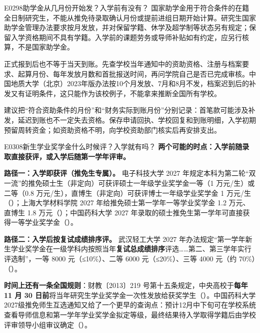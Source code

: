 \begin{qa}{E0298}{助学金从几月份开始发？入学前有没有？}
国家助学金用于符合条件的在籍全日制研究生，不能从推免待录取确认月份或提前进组日期开始计算。研究生国家助学金管理办法要求按月发放，并对保留学籍、休学及超学制等状态另有规定；保留入学资格期间不具有学籍。入学前的课题劳务或导师补贴如有约定，应另行核算，不是国家助学金。 

正式报到后也不等于当天到账。先查学校当年通知中的资助资格、注册与档案要求、起算月份、每年发放月数和首批报送时间，再问学院自己是否已完成审核。中国地质大学（北京）2023年版办法按10个月发放、7月和8月不发，档案迟到后的补发又有证明条件，这只能作为该校例子，不能拿来推断全国所有学校。

建议把“符合资助条件的月份”和“财务实际到账月份”分别记录：首笔款可能涉及补发，延迟到账也不一定失去资格。保存申请回执、学校回复和到账明细，入学初期预留周转资金；如资助资格不明，向学校资助部门核实后再安排支出。
\end{qa}

\begin{qa}{E0308}{新生学业奖学金什么时候评？入学就有吗？}
\textbf{两个可能的时点：入学前随录取直接获评，或入学后随第一学年评审。}

\textbf{路径一：入学即获评（推免生专属）。} 电子科技大学 2027 年规定本科为第二轮“双一流”的推免硕士生（非定向）可获评硕士一年级学业奖学金一等（1 万元/生）或二等（0.8 万元/生），直博生（非定向）可获评博士一年级学业奖学金 1 万元/生（）；上海大学材料学院 2027 年给推免硕士第一学年一等学业奖学金 1.2 万元、直博生 1.8 万元（）；中国药科大学 2027 年录取的硕士推免生第一学年可直接获得一等学业奖学金（）。

\textbf{路径二：入学后按复试成绩排序评。} 武汉轻工大学 2027 年办法规定“第一学年新生学业奖学金在一级学科内按照当年\textbf{复试总成绩排序}评选……第二、第三学年实行评选制”，一等 8000 元（≤10\%）、二等 6000 元（≤20\%）、三等 4000 元（约 70\%）（）。

\textbf{时间上还有一条全国规则}：财教〔2013〕219 号第十五条规定，中央高校于\textbf{每年 11 月 30 日前}将当年研究生学业奖学金一次性发放给获奖学生（）。中国药科大学2027级推免师生互选通知又给了一个更早的查询点：预计12月中下旬可在学校系统查看导师信息和第一学年学业奖学金拟定等级，最终结果待入学取得学籍后由学校评审领导小组审议确定（）。
\end{qa}

